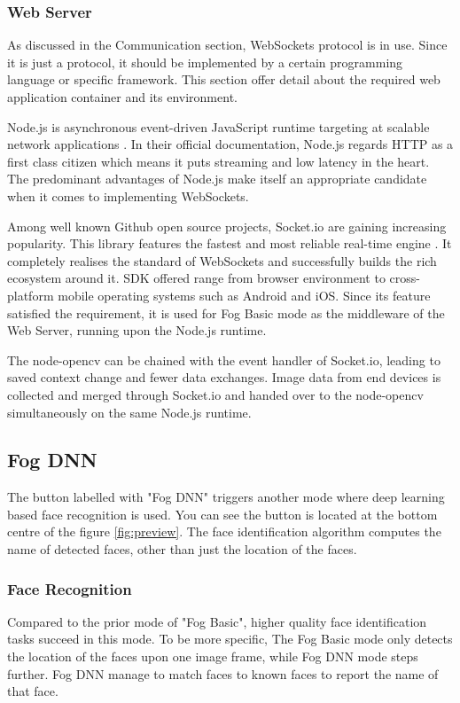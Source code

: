 \subsubsection{Web Server}
As discussed in the Communication section, WebSockets protocol is in use. Since it is just a protocol, it should be implemented by a certain programming language or specific framework. This section offer detail about the required web application container and its environment. 

Node.js is asynchronous event-driven JavaScript runtime targeting at scalable network applications \cite{nodejs}. In their official documentation, Node.js regards HTTP as a first class citizen which means it puts streaming and low latency in the heart. The predominant advantages of Node.js make itself an appropriate candidate when it comes to implementing WebSockets.

Among well known Github open source projects, Socket.io are gaining increasing popularity. This library features the fastest and most reliable real-time engine \cite{socketio}. It completely realises the standard of WebSockets and successfully builds the rich ecosystem around it. SDK offered range from browser environment to cross-platform mobile operating systems such as Android and iOS. Since its feature satisfied the requirement, it is used for Fog Basic mode as the middleware of the Web Server, running upon the Node.js runtime.

The node-opencv can be chained with the event handler of Socket.io, leading to saved context change and fewer data exchanges. Image data from end devices is collected and merged through Socket.io and handed over to the node-opencv simultaneously on the same Node.js runtime. 

\subsection{Fog DNN}
The button labelled with "Fog DNN" triggers another mode where deep learning based face recognition is used. You can see the button is located at the bottom centre of the figure \ref{fig:preview}.
The face identification algorithm computes the name of detected faces, other than just the location of the faces.  

\subsubsection{Face Recognition}
Compared to the prior mode of "Fog Basic", higher quality face identification tasks succeed in this mode. To be more specific, The Fog Basic mode only detects the location of the faces upon one image frame, while Fog DNN mode steps further. Fog DNN manage to match faces to known faces to report the name of that face.

